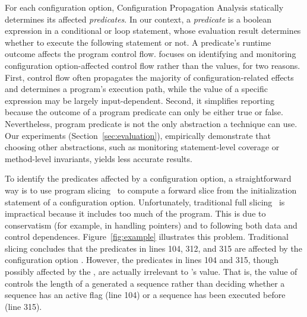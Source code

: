 For each configuration option, Configuration Propagation Analysis statically determines
its affected \textit{predicates}. In our context, a \textit{predicate}
is a boolean expression in a conditional or loop statement, whose evaluation result
determines whether to execute the following statement or not.
A predicate's runtime outcome affects the program control flow.
\ourtool focuses on identifying and monitoring 
configuration option-affected control flow
rather than the values, for two reasons. First, control flow 
often propagates the majority of configuration-related effects
and determines a program's execution path, while
the value of a specific expression may be largely input-dependent.
Second, it simplifies reporting because the outcome of a program predicate can only be
either true or false.  Nevertheless, program predicate is not the only
abstraction a technique can use. Our experiments (Section~\ref{sec:evaluation}),
empirically demonstrate that choosing other abstractions,
such as monitoring statement-level coverage
or method-level invariants, yields less accurate results.


To identify the predicates affected by a configuration option, a straightforward
way is to use program slicing~\cite{Horwitz:1988} to compute
a forward slice from the initialization statement of a
configuration option. Unfortunately, traditional full slicing~\cite{Horwitz:1988}
is impractical
because it includes too much of the program.  This is due to conservatism
(for example, in handling pointers) and to following both data and control
dependences.
Figure~\ref{fig:example} illustrates
this problem.  Traditional slicing concludes that the predicates
in lines 104, 312, and 315 are affected by the configuration option .
However, the predicates in lines 104 and 315, though possibly
affected by the , are actually irrelevant
to 's value. That is, the value of 
controls the length of a generated a sequence rather
than deciding whether a sequence has an active flag (line 104) or
a sequence has been executed before (line 315).

